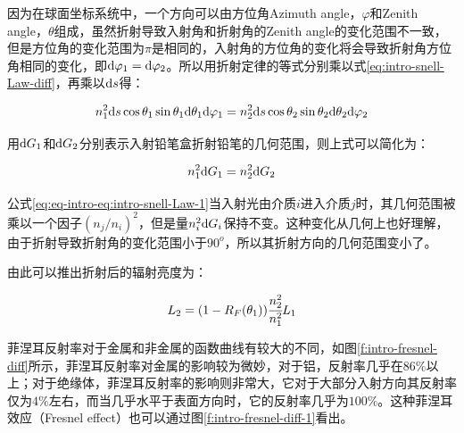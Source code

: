 \noindent 因为在球面坐标系统中，一个方向可以由方位角Azimuth angle，$\varphi$和Zenith angle，$\theta$组成，虽然折射导致入射角和折射角的Zenith angle的变化范围不一致，但是方位角的变化范围为$\pi$是相同的，入射角的方位角的变化将会导致折射角方位角相同的变化，即${\rm d}\varphi_1={\rm d}\varphi_2$。所以用折射定律的等式分别乘以式\ref{eq:intro-snell-Law-diff}，再乘以${\rm d}s$得：

\begin{equation}
	n^{2}_1{\rm d}s\cos\theta_1 \sin\theta_1 {\rm d}\theta_1 {\rm d}\varphi_1=n^{2}_2 {\rm d}s \cos\theta_2 \sin\theta_2 {\rm d}\theta_2 {\rm d}\varphi_2
\end{equation}

\noindent 用${\rm d}G_1$和${\rm d}G_2$分别表示入射铅笔盒折射铅笔的几何范围，则上式可以简化为：

\begin{equation}\label{eq:eq-intro-eq:intro-snell-Law-1}
	n^{2}_1 {\rm d}G_1=n^{2}_2 {\rm d}G_2
\end{equation}

\noindent 公式\ref{eq:eq-intro-eq:intro-snell-Law-1}当入射光由介质$i$进入介质$j$时，其几何范围被乘以一个因子$(n_j/n_i)^2$，但是量$n^2_i{\rm d}G_i$保持不变。这种变化从几何上也好理解，由于折射导致折射角的变化范围小于$90^o$，所以其折射方向的几何范围变小了。

由此可以推出折射后的辐射亮度为：

\begin{equation}\label{eq:intro-fresnel-refractiom}
	L_2=(1-R_F(\theta_1)) \cfrac{n^2_2}{n^2_1}L_1
\end{equation}

\noindent 菲涅耳反射率对于金属和非金属的函数曲线有较大的不同，如图\ref{f:intro-fresnel-diff}所示，菲涅耳反射率对金属的影响较为微妙，对于铝，反射率几乎在$86\%$以上；对于绝缘体，菲涅耳反射率的影响则非常大，它对于大部分入射方向其反射率仅为$4\%$左右，而当几乎水平于表面方向时，它的反射率几乎为$100\%$。这种菲涅耳效应（Fresnel effect）也可以通过图\ref{f:intro-fresnel-diff-1}看出。


